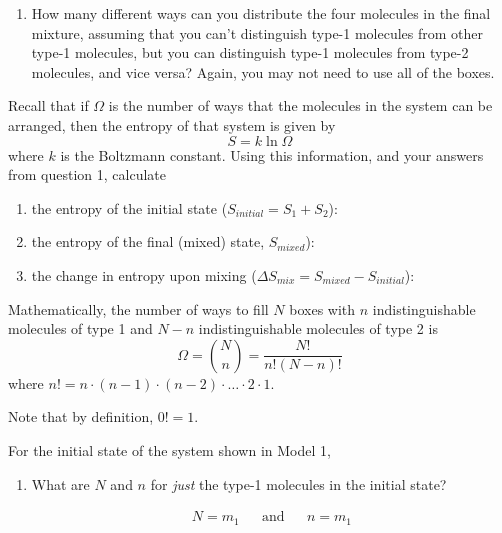 \begin{activity}
\begin{ctqs}
\begin{enumerate}
			\item How many different ways can you distribute the four molecules in the final mixture, assuming that you can't distinguish type-1 molecules from other type-1 molecules, but you can distinguish type-1 molecules from type-2 molecules, and vice versa?  Again, you may not need to use all of the boxes.
		\end{enumerate}
		
	\question Recall that if $\Omega$ is the number of ways that the molecules in the system can be arranged, then the entropy of that system is given by
		\begin{equation*}
			S = k \ln \Omega
		\end{equation*} 
		where $k$ is the Boltzmann constant.  Using this information, and your answers from question 1, calculate
			
		\begin{enumerate}
			\item the entropy of the initial state ($S_{initial} = S_1 + S_2$):
			\item the entropy of the final (mixed) state, $S_{mixed}$):
			\item the change in entropy upon mixing ($\Delta S_{mix} = S_{mixed} - S_{initial}$): 
		\end{enumerate}
		
\end{ctqs}

\begin{infobox}
	Mathematically, the number of ways to fill $N$ boxes with $n$ indistinguishable molecules of type 1 and $N-n$ indistinguishable molecules of type 2 is
	\begin{equation*}
		\Omega = {N \choose n} = \frac{N!}{n!(N-n)!}
	\end{equation*}
	where $n! = n\cdot(n-1)\cdot(n-2)\cdot\dots\cdot 2 \cdot 1$.
	
	Note that by definition, $0!=1$.
\end{infobox}

\vspace{0.05in}
\begin{ctqs}
		
		\question For the initial state of the system shown in Model 1,
			\begin{enumerate}
				\item What are $N$ and $n$ for \emph{just} the type-1 molecules in the initial state?
				
					\begin{solution}[0.75in]
						\begin{align*}
							N = m_1 && \text{and} && n = m_1
						\end{align*}
					\end{solution}
					

\end{enumerate}
\end{ctqs}
\end{activity}

